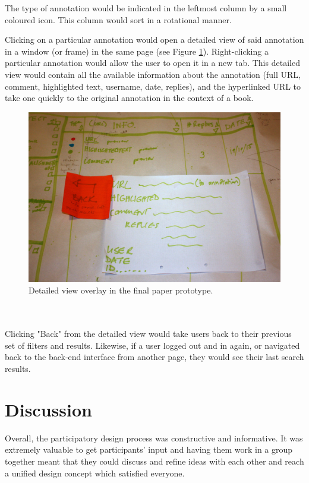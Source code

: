 The type of annotation would be indicated in the leftmost column by a small coloured icon. This column would sort in a rotational manner. 

Clicking on a particular annotation would open a detailed view of said annotation in a window (or frame) in the same page (see Figure \ref{fig:detailedoverlay}). Right-clicking a particular annotation would allow the user to open it in a new tab. This detailed view would contain all the available information about the annotation (full URL, comment, highlighted text, username, date, replies), and the hyperlinked URL to take one quickly to the original annotation in the context of a book.
\begin{figure}[h!]
    \centering
     \includegraphics[width=\textwidth]{Figures/forweb/IMG_9044small.jpg}

 \caption{Detailed view overlay in the final paper prototype.}
 \label{fig:detailedoverlay}
\end{figure}
\\
\\
Clicking "Back" from the detailed view would take users back to their previous set of filters and results. Likewise, if a user logged out and in again, or navigated back to the back-end interface from another page, they would see their last search results. 

\section{Discussion}
Overall, the participatory design process was constructive and informative. It was extremely valuable to get participants' input and having them work in a group together meant that they could discuss and refine ideas with each other and reach a unified design concept which satisfied everyone. 

